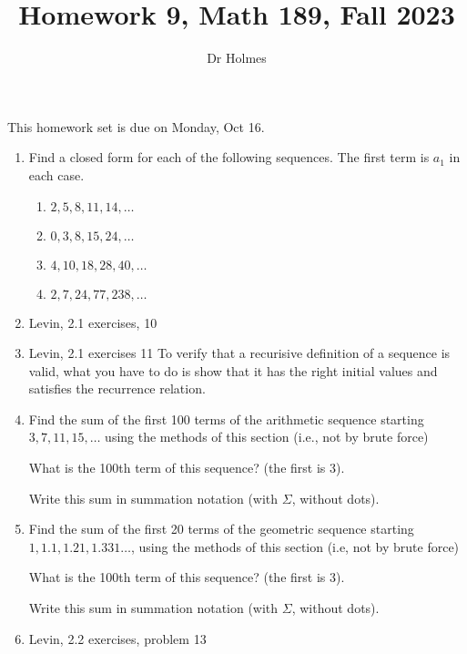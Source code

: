 \documentclass[12pt]{article}
\title{Homework 9, Math 189, Fall 2023}
\author{Dr Holmes}
\begin{document}
\maketitle

This homework set is due on Monday, Oct 16.

\begin{enumerate}

\item  Find a closed form for each of the following sequences.  The first term is $a_1$ in each case.

\begin{enumerate}


\item  $2,5,8,11,14,\ldots$

\item  $0,3,8,15,24,\ldots$

\item  $4,10, 18, 28, 40,\ldots$

\item  $2,7,24,77,238,\ldots$

\end{enumerate}

\item  Levin, 2.1 exercises, 10

\item  Levin, 2.1 exercises 11  To verify that a recurisive definition of a sequence is valid, what you have to do is show that it has the right initial values and satisfies the recurrence relation.

\item  Find the sum of the first 100 terms of the arithmetic sequence starting $3,7,11,15,\ldots$ using the methods of this section (i.e., not by brute force)

What is the 100th term of this sequence?  (the first is 3).

Write this sum in summation notation (with $\Sigma$, without dots).

\item  Find the sum of the first 20 terms of the geometric sequence starting $1, 1.1, 1.21, 1.331\ldots$, using the methods of this section (i.e, not by brute force)

What is the 100th term of this sequence?  (the first is 3).

Write this sum in summation notation (with $\Sigma$, without dots).

\item  Levin, 2.2 exercises, problem 13

\end{enumerate}
\end{document}
